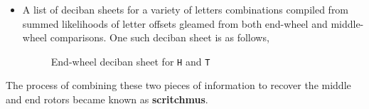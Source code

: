 \begin{itemize}
  \item A list of deciban sheets for a variety of letters
    combinations compiled from summed likelihoods of letter offsets
    gleamed from both end-wheel and middle-wheel comparisons. One
    such deciban sheet is as follows,
    \begin{figure}[H]
      \begin{center}
      \end{center}

      \caption{End-wheel deciban sheet for \texttt{H} and \texttt{T}}
      \label{fig:deciban_sheet}
    \end{figure}
\end{itemize}
The process of combining these two pieces of information to recover
the middle and end rotors became known as {\bf{scritchmus}}.

